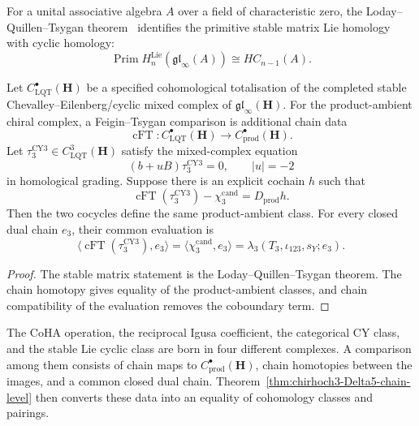 \begin{theorem}
\label{thm:chirhoch3-Delta5-feigin-tsygan}
\ClaimStatusConditional
For a unital associative algebra \(A\) over a field of characteristic
zero, the Loday--Quillen--Tsygan theorem~\cite{FT87} identifies the primitive stable
matrix Lie homology with cyclic homology:
\[
 \operatorname{Prim}H_n^{\mathrm{Lie}}(\mathfrak{gl}_\infty(A))
 \cong HC_{n-1}(A).
\]

Let \(C^\bullet_{\mathrm{LQT}}(\mathbf H)\) be a specified
cohomological totalisation of the completed stable
Chevalley--Eilenberg/cyclic mixed complex of
\(\mathfrak{gl}_\infty(\mathbf H)\).  For the product-ambient chiral
complex, a Feigin--Tsygan comparison is additional chain data
\begin{equation}
\label{eq:chiral-feigin-tsygan}
 \operatorname{cFT}\colon
 C^\bullet_{\mathrm{LQT}}(\mathbf H)
 \longrightarrow C^\bullet_{\mathrm{prod}}(\mathbf H).
\end{equation}
Let \(\tau_3^{\mathrm{CY3}}\in
C^3_{\mathrm{LQT}}(\mathbf H)\) satisfy the mixed-complex equation
\begin{equation}
\label{eq:cyclic-CY3-trace}
 (b+uB)\tau_3^{\mathrm{CY3}}=0,
 \qquad |u|=-2
\end{equation}
in homological grading.
Suppose there is an explicit cochain \(h\) such that
\[
 \operatorname{cFT}(\tau_3^{\mathrm{CY3}})
 -\chi_3^{\mathrm{cand}}=D_{\mathrm{prod}}h.
\]
Then the two cocycles define the same product-ambient class.  For every
closed dual chain \(e_3\), their common evaluation is
\begin{equation}
\label{eq:chi3-cyclic-value}
 \bigl\langle\operatorname{cFT}(\tau_3^{\mathrm{CY3}}),e_3\bigr\rangle
 =\bigl\langle\chi_3^{\mathrm{cand}},e_3\bigr\rangle
 =\lambda_3(T_3,\iota_{123},s_Y;e_3).
\end{equation}
\end{theorem}

\begin{proof}
The stable matrix statement is the Loday--Quillen--Tsygan theorem.
The chain homotopy gives equality of the product-ambient classes, and
chain compatibility of the evaluation removes the coboundary term.
\end{proof}

\begin{remark}
\label{rem:chirhoch3-five-paths}
The CoHA operation, the reciprocal Igusa coefficient, the categorical
CY class, and the stable Lie cyclic class are born in four different
complexes.  A comparison among them consists of chain maps to
\(C^\bullet_{\mathrm{prod}}(\mathbf H)\), chain homotopies between the
images, and a common closed dual chain.  Theorem~\ref{thm:chirhoch3-Delta5-chain-level}
then converts these data into an equality of cohomology classes and
pairings.
\end{remark}


